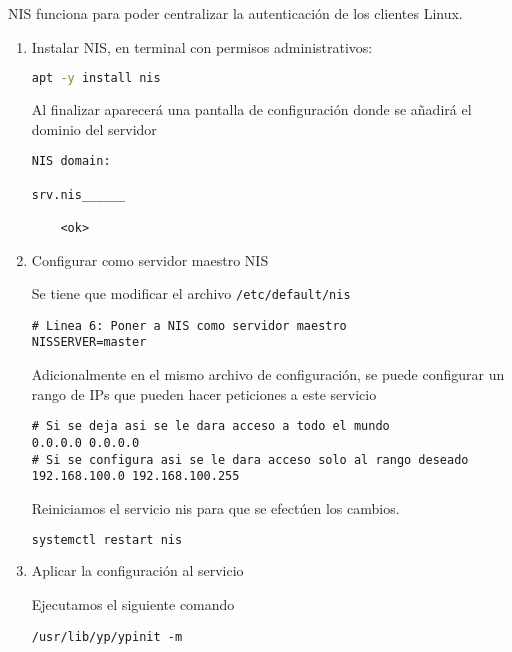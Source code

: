 \documentclass[../main.tex]{subfiles}
\begin{document}
NIS funciona para poder centralizar la autenticación de los clientes Linux.
\lstset{style=mystyle}
\begin{enumerate}
\item Instalar NIS, en terminal con permisos administrativos:

  \begin{lstlisting}[language=bash,style=mystyle]
apt -y install nis
  \end{lstlisting}

  Al finalizar aparecerá una pantalla de configuración donde se
  añadirá el dominio del servidor

  \begin{lstlisting}
NIS domain:

srv.nis______

    <ok>
\end{lstlisting}
  
\item Configurar como servidor maestro NIS

  Se tiene que modificar el archivo \lstinline|/etc/default/nis|

  \begin{lstlisting}[label={list:nis},caption=Modificación del archivo /etc/default/nis]
# Linea 6: Poner a NIS como servidor maestro
NISSERVER=master
\end{lstlisting}

  Adicionalmente en el mismo archivo de configuración, se puede
  configurar un rango de IPs que pueden hacer peticiones
  a este servicio

  \begin{lstlisting}
# Si se deja asi se le dara acceso a todo el mundo
0.0.0.0 0.0.0.0
# Si se configura asi se le dara acceso solo al rango deseado
192.168.100.0 192.168.100.255
\end{lstlisting}

  Reiniciamos el servicio nis para que se efectúen los cambios.

  \begin{lstlisting}[language=bash,style=mystyle]
systemctl restart nis
\end{lstlisting}

  
\item Aplicar la configuración al servicio

  Ejecutamos el siguiente comando

  \begin{lstlisting}
/usr/lib/yp/ypinit -m
\end{lstlisting}


\end{enumerate}
\end{document}
